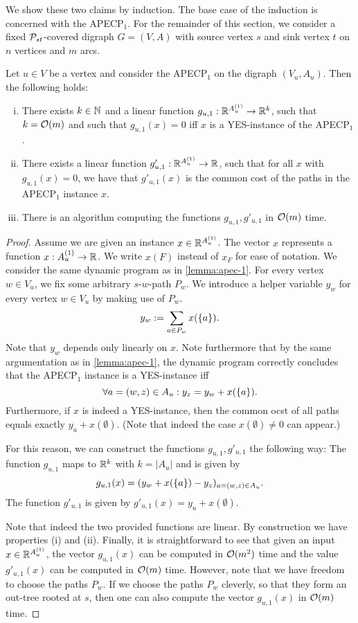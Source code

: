 We show these two claims by induction. The base case of the induction is concerned with the APECP$_1$. For the remainder of this section, we consider a fixed $\mathcal{P}_{st}$-covered digraph $G = (V, A)$ with source vertex $s$ and sink vertex $t$ on $n$ vertices and $m$ arcs.

\begin{lemma}
\label{lemma:subspaces-apec-1}
    Let $u \in V$ be a vertex and consider the APECP$_1$ on the digraph $(V_u, A_u)$. Then the following holds:
    \begin{enumerate}[(i)]
        \item There exists $k \in \mathbb{N}$ and a linear function $g_{u,1} : \mathbb{R}^{A_u^{(1)}} \rightarrow \mathbb{R}^k$, such that $k = \mathcal{O}(m)$ and such that $g_{u,1}(x) = 0$ iff $x$ is a YES-instance of the APECP$_1$.
        \item There exists a linear function $g'_{u,1} : \mathbb{R}^{A_u^{(1)}} \rightarrow \mathbb{R}$, such that for all $x$ with $g_{u,1}(x) = 0$, we have that $g'_{u,1}(x)$ is the common cost of the paths in the APECP$_1$ instance $x$.
        \item There is an algorithm computing the functions $g_{u,1}, g'_{u,1}$ in $\mathcal{O}(m)$ time.
    \end{enumerate}
\end{lemma}
\begin{proof}
    Assume we are given an instance $x \in \mathbb{R}^{A_u^{(1)}}$. The vector $x$ represents a function $x : A_u^{(1)} \rightarrow \mathbb{R}$. We write $x(F)$ instead of $x_F$ for ease of notation.
    We consider the same dynamic program as in \cref{lemma:apec-1}. For every vertex $w \in V_u$, we fix some arbitrary $s$-$w$-path $P_w$.
    We introduce a helper variable $y_w$ for every vertex $w \in V_u$ by making use of $P_w$.
    \[ y_w := \sum_{a \in P_w}x(\{ a \}).\]
    Note that $y_w$ depends only linearly on $x$. Note furthermore that by the same argumentation as in \cref{lemma:apec-1}, the dynamic program correctly concludes that the APECP$_1$ instance is a YES-instance iff
    \[\forall a = (w,z) \in A_u : y_z = y_w + x(\{ a \}). \]
    Furthermore, if $x$ is indeed a YES-instance, then the common ocst of all paths equals exactly $y_u + x(\emptyset)$. (Note that indeed the case $x(\emptyset) \neq 0$ can appear.)

    For this reason, we can construct the functions $g_{u,1}, g'_{u,1}$ the following way: The function $g_{u,1}$ maps to $\mathbb{R}^k$ with $k = |A_u|$ and is given by
    \[ g_{u,1}(x) = ( y_w + x(\{ a \}) - y_z)_{a = (w,z) \in A_u}.\]
    The function $g'_{u,1}$ is given by $g'_{u,1}(x) = y_u + x(\emptyset)$.

    Note that indeed the two provided functions are linear. By construction we have properties (i) and (ii). Finally, it is straightforward to see that given an input $x \in \mathbb{R}^{A_u^{(1)}}$, the vector $g_{u,1}(x)$ can be computed in $\mathcal{O}(m^2)$ time and the value $g'_{u,1}(x)$ can be computed in $\mathcal{O}(m)$ time. However, note that we have freedom to choose the paths $P_w$. If we choose the paths $P_w$ cleverly, so that they form an out-tree rooted at $s$, then one can also compute the vector $g_{u,1}(x)$ in $\mathcal{O}(m)$ time.   
\end{proof}


